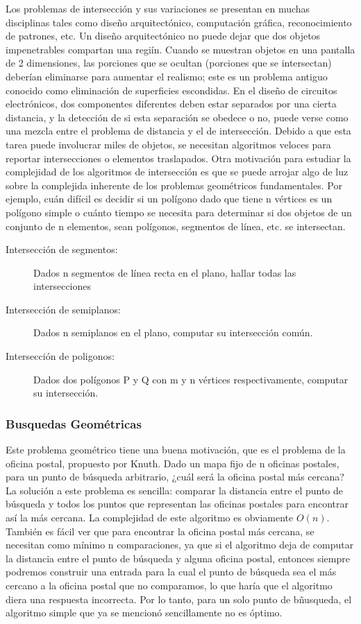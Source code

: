 \documentclass[final, 12pt letterpaper]{article}
\begin{document}
Los problemas de intersección y sus variaciones se presentan en muchas disciplinas tales como diseño arquitectónico, computación gráfica, reconocimiento de patrones, etc. Un diseño arquitectónico no puede dejar que dos objetos impenetrables compartan una regiín. Cuando se muestran objetos en una pantalla de 2 dimensiones, las porciones que se ocultan (porciones que se intersectan) deberían eliminarse para aumentar el realismo; este es un problema antiguo conocido como eliminación de superficies escondidas. En el diseño de circuitos electrónicos, dos componentes diferentes deben estar separados por una cierta distancia, y la detección de si esta separación se obedece o no, puede verse como una mezcla entre el problema de distancia y el de intersección. Debido a que esta tarea puede involucrar miles de objetos, se necesitan algoritmos veloces para reportar intersecciones o elementos traslapados. Otra motivación para estudiar la complejidad de los algoritmos de intersección es que se puede arrojar algo de luz sobre la complejida inherente de los problemas geométricos fundamentales. Por ejemplo, cuán difícil es decidir si un polígono dado que tiene n vértices es un polígono simple o cuánto tiempo se necesita para determinar si dos objetos de un conjunto de n elementos, sean polígonos, segmentos de línea, etc. se intersectan.

\begin{description}
\item[Intersección de segmentos:] Dados n segmentos de línea recta en el plano, hallar todas las intersecciones
\item [Intersección de semiplanos:] Dados n semiplanos en el plano, computar su intersección común.
\item [Intersección de poligonos:] Dados dos polígonos P y Q con m y n vértices respectivamente, computar su intersección.
\end{description}

\subsubsection{Busquedas Geométricas}

Este problema geométrico tiene una buena motivación, que es el problema de la oficina postal, propuesto por Knuth. Dado un mapa fijo de n oficinas postales, para un punto de búsqueda arbitrario, ¿cuál será la oficina postal más cercana? La solución a este problema es sencilla: comparar la distancia entre el punto de búsqueda y todos los puntos que representan las oficinas postales para encontrar así la más cercana. La complejidad de este algoritmo es obviamente $O(n)$. También es fácil ver que para encontrar la oficina postal más cercana, se necesitan como mínimo n comparaciones, ya que si el algoritmo deja de computar la distancia entre el punto de búsqueda y alguna oficina postal, entonces siempre podremos construir una entrada para la cual el punto de búsqueda sea el más cercano a la oficina postal que no comparamos, lo que haría que el algoritmo diera una respuesta incorrecta. Por lo tanto, para un solo punto de bñusqueda, el algoritmo simple que ya se mencionó sencillamente no es óptimo.
\end{document}
